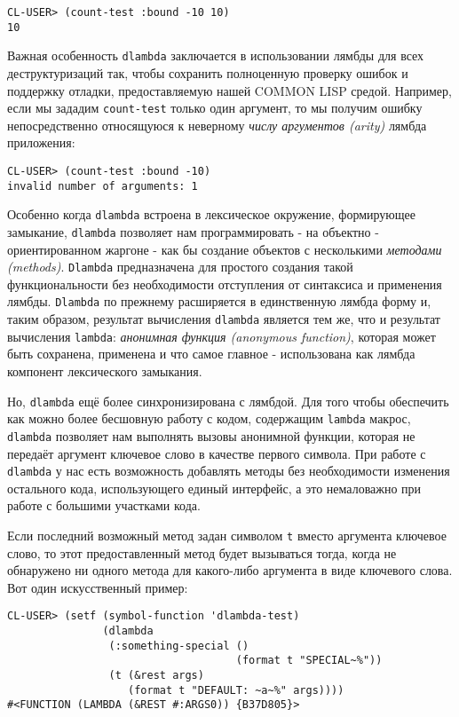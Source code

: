 \begin{verbatim}
CL-USER> (count-test :bound -10 10)
10
\end{verbatim}

Важная особенность \verb"dlambda" заключается в использовании лямбды для всех деструктуризаций так, чтобы сохранить полноценную проверку ошибок и поддержку отладки, предоставляемую нашей COMMON LISP средой. Например, если мы зададим \verb"count-test" только один аргумент, то мы получим ошибку непосредственно относящуюся к неверному \emph{числу аргументов (arity)} лямбда приложения:

\begin{verbatim}
CL-USER> (count-test :bound -10)
invalid number of arguments: 1
\end{verbatim}

Особенно когда \verb"dlambda" встроена в лексическое окружение, формирующее замыкание, \verb"dlambda" позволяет нам программировать - на объектно - ориентированном жаргоне - как бы создание объектов с несколькими \emph{методами (methods)}. \verb"Dlambda" предназначена для простого создания такой функциональности без необходимости отступления от синтаксиса и применения лямбды. \verb"Dlambda" по прежнему расширяется в единственную лямбда форму и, таким образом, результат вычисления \verb"dlambda" является тем же, что и результат вычисления \verb"lambda": \emph{анонимная функция (anonymous function)}, которая может быть сохранена, применена и что самое главное - использована как лямбда компонент лексического замыкания.

Но, \verb"dlambda" ещё более синхронизирована с лямбдой. Для того чтобы обеспечить как можно более бесшовную работу с кодом, содержащим \verb"lambda" макрос, \verb"dlambda" позволяет нам выполнять вызовы анонимной функции, которая не передаёт аргумент ключевое слово в качестве первого символа. При работе с \verb"dlambda" у нас есть возможность добавлять методы без необходимости изменения остального кода, использующего единый интерфейс, а это немаловажно при работе с большими участками кода.

Если последний возможный метод задан символом \verb"t" вместо аргумента ключевое слово, то этот предоставленный метод будет вызываться тогда, когда не обнаружено ни одного метода для какого-либо аргумента в виде ключевого слова. Вот один искусственный пример:

\begin{verbatim}
CL-USER> (setf (symbol-function 'dlambda-test)
               (dlambda
                (:something-special ()
                                    (format t "SPECIAL~%"))
                (t (&rest args)
                   (format t "DEFAULT: ~a~%" args))))
#<FUNCTION (LAMBDA (&REST #:ARGS0)) {B37D805}>
\end{verbatim}

